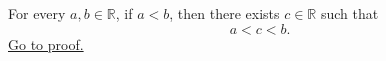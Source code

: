 \begin{corollary}
\label{cor:no-adjacent-real-numbers}
For every $a,b\in\mathbb{R}$, if $a<b$, then there exists
$c\in\mathbb{R}$ such that
\[
  a<c<b.
\]
\hyperref[prf:no-adjacent-real-numbers]{Go to proof.}
\end{corollary}